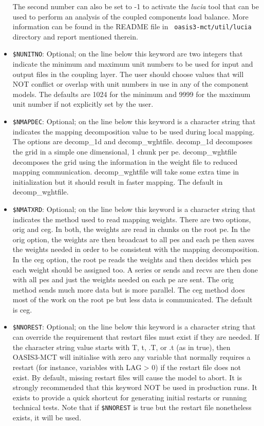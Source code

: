 \begin{itemize}
The second number can also be set to -1 to activate the {\it lucia}
tool that can be used to perform an analysis of the coupled components
load balance. More information can be found in the README file in {\tt
  oasis3-mct/util/lucia} directory and report mentioned therein.
 
\item {\tt \$NUNITNO}: Optional; on the line below this keyword are two integers
  that indicate the minimum and maximum unit numbers to be used for
  input and output files in the coupling layer.  The user should
  choose values that will NOT conflict or overlap with unit numbers in 
  use in any of the component models. The defaults are 1024 for the minimum and 9999
  for the maximum unit number if not explicitly set by the user.

\item {\tt \$NMAPDEC}: Optional; on the line below this keyword is a character string
  that indicates the mapping decomposition value to be used during local mapping.  The
  options are decomp\_1d and decomp\_wghtfile.  decomp\_1d decomposes the grid in a simple
  one dimensional, 1 chunk per pe.  decomp\_wghtfile decomposes the grid using the
  information in the weight file to reduced mapping communication. decomp\_wghtfile
  will take some extra time in initialization but it should result in faster mapping.
  The default in decomp\_wghtfile.

\item {\tt \$NMATXRD}: Optional; on the line below this keyword is a character string
  that indicates the method used to read mapping weights.  There are two options, orig
  and ceg.  In both, the weights are read in chunks on the root pe.  In the orig option, 
  the weights are then broadcast to all pes and each pe then saves the weights needed in
  order to be consistent with the mapping decomposition.  In the ceg option, the root pe 
  reads the weights and then decides which pes each weight should be assigned too.  A
  series or sends and recvs are then done with all pes and just the weights needed on
  each pe are sent.  The orig method sends much more data but is more parallel.  The ceg
  method does most of the work on the root pe but less data is communicated.  The default
  is ceg.

\item {\tt \$NNOREST}: Optional; on the line below this keyword is a character
  string that can override the requirement that restart files must exist
  if they are needed.  If the character string value starts with T, t, .T, 
  or .t (as in true), then OASIS3-MCT will initialise with zero any variable that normally requires
  a restart (for instance, variables with LAG > 0) if the restart file does not exist. By default, missing
  restart files will cause the model to abort.  It is strongly recommended
  that this keyword NOT be used in production runs.  It exists to provide a 
  quick shortcut for generating initial restarts or running technical tests. 
  Note that if {\tt \$NNOREST} is true but the restart file nonetheless exists, it will be used.
 

\end{itemize}

